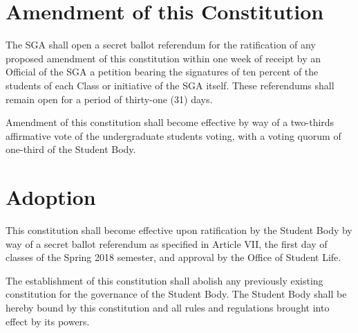 \documentclass[12pt,oneside]{scrreprt}
\begin{document}
\chapter{Amendment of this Constitution}
The SGA shall open a secret ballot referendum for the ratification of any proposed amendment of this constitution within one week of receipt by an Official of the SGA a petition bearing the signatures of ten percent of the students of each Class or initiative of the SGA itself. These referendums shall remain open for a period of thirty-one (31) days.

Amendment of this constitution shall become effective by way of a two-thirds affirmative
vote of the undergraduate students voting, with a voting quorum of one-third of the Student Body.

\chapter{Adoption}
This constitution shall become effective upon ratification by the Student Body by way of a secret ballot referendum as specified in Article VII, the first day of classes of the Spring 2018 semester, and approval by the Office of Student Life.

The establishment of this constitution shall abolish any previously existing constitution for the governance of the Student Body. The Student Body shall be hereby bound by this constitution and all rules and regulations brought into effect by its powers.
\end{document}

